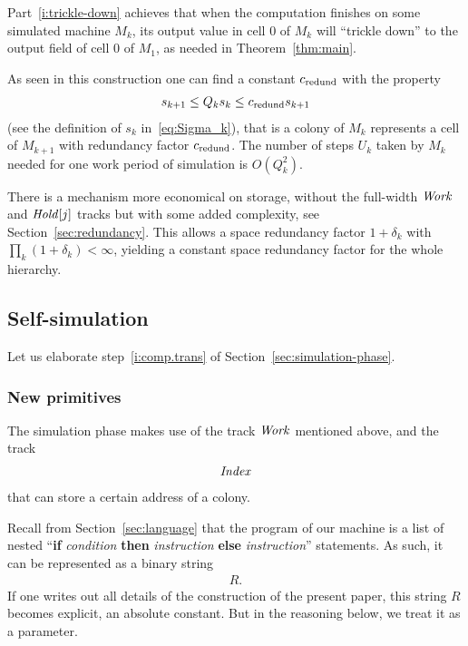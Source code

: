 \documentclass[11pt]{memoir}
\theoremstyle{definition} %
\renewcommand{\le}{\leq}
\newcommand{\fld}[1]{\ensuremath{\textit{#1\/}}}
\def\U{U}
\newcommand{\Q}{Q} %
\newcommand{\Hold}{\fld{Hold}}
\newcommand{\Index}{\fld{Index}}
\newcommand{\Work}{\fld{Work}} %
\newcommand{\cns}[1]{c_{\textrm{\upshape #1}}}
\newcommand{\CRedund}{\cns{redund}}
\begin{document}
Part~\ref{i:trickle-down} achieves that when the computation finishes on some
simulated machine \( M_{k} \),
its output value in cell 0 of \( M_{k} \) will ``trickle down'' to the output field of  cell 0 of \( M_{1} \),
as needed in Theorem~\ref{thm:main}.

As seen in this construction one can find a constant \( \CRedund \) with the property
\begin{align}\label{eq:redund}
    s_{k+1}\le\Q_{k}s_{k}\le \CRedund s_{k+1}
\end{align}
(see the definition of \( s_{k} \) in~\eqref{eq:Sigma_k}),
that is a colony of \( M_{k} \) represents a cell of \( M_{k+1} \) with redundancy
factor \( \CRedund \).
The number of steps \( \U_{k} \) taken by \( M_{k} \) needed for one work period
of simulation is \( O(\Q_{k}^{2}) \).

\begin{remark}
  There is a mechanism more economical on storage, without the full-width
  \( \Work \) and \( \Hold[j] \) tracks but with some
  added complexity, see Section~\ref{sec:redundancy}.
  This allows a space redundancy factor \( 1+\delta_{k} \) with \( \prod_{k}(1+\delta_{k})<\infty \),
  yielding a constant space redundancy factor for the whole hierarchy.
\end{remark}


\subsection{Self-simulation}\label{sec:self-simulation}

Let us elaborate step~\ref{i:comp.trans} of Section~\ref{sec:simulation-phase}.

\subsubsection{New primitives}

The simulation phase makes use of the track \( \Work \) mentioned above, and the track
\begin{align*}
   \Index
 \end{align*}
that can store a certain address of a colony.

Recall from Section~\ref{sec:language} that the program
of our machine is a list of nested
``\textbf{if} \emph{condition} \textbf{then} \emph{instruction}
\textbf{else} \emph{instruction}''
statements.
As such, it can be represented as a binary string 
 \begin{align*}
   R.
 \end{align*}
If one writes out all details of the construction of the present paper, this string \( R \)
becomes explicit, an absolute constant.
But in the reasoning below, we treat it as a parameter.
\end{document}
